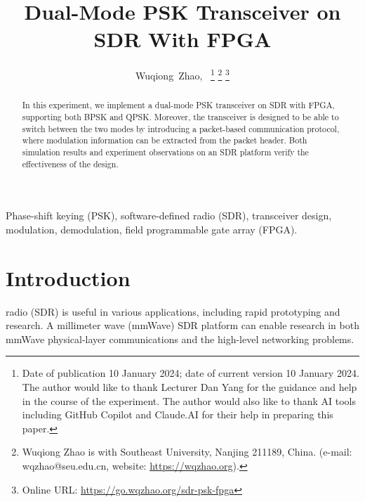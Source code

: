 \documentclass[journal,twoside]{IEEEtran}
\begin{document}
  \title{Dual-Mode PSK Transceiver on SDR With FPGA}

  \author{%
    Wuqiong~Zhao{\hspace{.1em}\textsuperscript{}},~
    \thanks{Date of publication 10 January 2024; date of current version 10 January 2024.
      The author would like to thank Lecturer Dan Yang for the guidance and help in the course of the experiment.
      The author would also like to thank AI tools including GitHub Copilot and Claude.AI for their help in preparing this paper.}
    \thanks{Wuqiong Zhao is with Southeast University, Nanjing 211189, China. (e-mail: wqzhao@seu.edu.cn, website: \url{https://wqzhao.org}).}
    \thanks{Online URL: \url{https://go.wqzhao.org/sdr-psk-fpga}}
  }


  \maketitle

  \begin{abstract}
    In this experiment, we implement a dual-mode PSK transceiver on SDR with FPGA,
    supporting both BPSK and QPSK.
    Moreover, the transceiver is designed to be able to switch between the two modes by introducing a packet-based communication protocol,
    where modulation information can be extracted from the packet header.
    Both simulation results and experiment observations on an SDR platform verify the effectiveness of the design.
  \end{abstract}
  \begin{IEEEkeywords}
    Phase-shift keying (PSK), software-defined radio (SDR), transceiver design, modulation, demodulation, field programmable gate array (FPGA).
  \end{IEEEkeywords}

  \section{Introduction}

     radio (SDR) is useful in various applications,
    including rapid prototyping and research.
    A millimeter wave (mmWave) SDR platform \cite{zhao2020m} can enable research in both mmWave physical-layer communications
    and the high-level networking problems.
\end{document}
